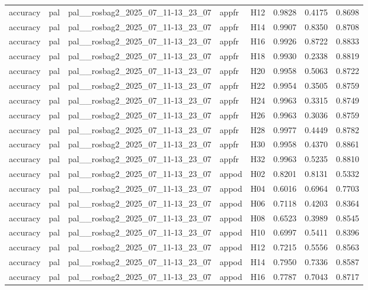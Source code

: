 \begin{table}[tbp]
\begin{tabular}{lllllrrr}
accuracy & pal & pal\_\_rosbag2\_2025\_07\_11-13\_23\_07 & appfr & H12 & 0.9828 & 0.4175 & 0.8698 \\
accuracy & pal & pal\_\_rosbag2\_2025\_07\_11-13\_23\_07 & appfr & H14 & 0.9907 & 0.8350 & 0.8708 \\
accuracy & pal & pal\_\_rosbag2\_2025\_07\_11-13\_23\_07 & appfr & H16 & 0.9926 & 0.8722 & 0.8833 \\
accuracy & pal & pal\_\_rosbag2\_2025\_07\_11-13\_23\_07 & appfr & H18 & 0.9930 & 0.2338 & 0.8819 \\
accuracy & pal & pal\_\_rosbag2\_2025\_07\_11-13\_23\_07 & appfr & H20 & 0.9958 & 0.5063 & 0.8722 \\
accuracy & pal & pal\_\_rosbag2\_2025\_07\_11-13\_23\_07 & appfr & H22 & 0.9954 & 0.3505 & 0.8759 \\
accuracy & pal & pal\_\_rosbag2\_2025\_07\_11-13\_23\_07 & appfr & H24 & 0.9963 & 0.3315 & 0.8749 \\
accuracy & pal & pal\_\_rosbag2\_2025\_07\_11-13\_23\_07 & appfr & H26 & 0.9963 & 0.3036 & 0.8759 \\
accuracy & pal & pal\_\_rosbag2\_2025\_07\_11-13\_23\_07 & appfr & H28 & 0.9977 & 0.4449 & 0.8782 \\
accuracy & pal & pal\_\_rosbag2\_2025\_07\_11-13\_23\_07 & appfr & H30 & 0.9958 & 0.4370 & 0.8861 \\
accuracy & pal & pal\_\_rosbag2\_2025\_07\_11-13\_23\_07 & appfr & H32 & 0.9963 & 0.5235 & 0.8810 \\
accuracy & pal & pal\_\_rosbag2\_2025\_07\_11-13\_23\_07 & appod & H02 & 0.8201 & 0.8131 & 0.5332 \\
accuracy & pal & pal\_\_rosbag2\_2025\_07\_11-13\_23\_07 & appod & H04 & 0.6016 & 0.6964 & 0.7703 \\
accuracy & pal & pal\_\_rosbag2\_2025\_07\_11-13\_23\_07 & appod & H06 & 0.7118 & 0.4203 & 0.8364 \\
accuracy & pal & pal\_\_rosbag2\_2025\_07\_11-13\_23\_07 & appod & H08 & 0.6523 & 0.3989 & 0.8545 \\
accuracy & pal & pal\_\_rosbag2\_2025\_07\_11-13\_23\_07 & appod & H10 & 0.6997 & 0.5411 & 0.8396 \\
accuracy & pal & pal\_\_rosbag2\_2025\_07\_11-13\_23\_07 & appod & H12 & 0.7215 & 0.5556 & 0.8563 \\
accuracy & pal & pal\_\_rosbag2\_2025\_07\_11-13\_23\_07 & appod & H14 & 0.7950 & 0.7336 & 0.8587 \\
accuracy & pal & pal\_\_rosbag2\_2025\_07\_11-13\_23\_07 & appod & H16 & 0.7787 & 0.7043 & 0.8717 \\

\end{tabular}
\end{table}
